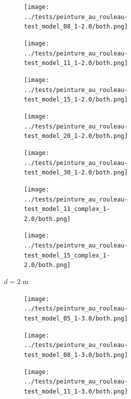 \documentclass[english,RandD]{rapportPFE}  %
\begin{document}
\begin{figure}[H]
\begin{subfigure}[t]{\linewidth}
\begin{subfigure}[t]{0.11\linewidth}
				\end{subfigure}
				\hfill
				\begin{subfigure}[t]{0.11\linewidth}
					\texttt{[image: ../tests/peinture\_au\_rouleau-test\_model\_08\_1-2.0/both.png]}
				\end{subfigure}
				\hfill
				\begin{subfigure}[t]{0.11\linewidth}
					\texttt{[image: ../tests/peinture\_au\_rouleau-test\_model\_11\_1-2.0/both.png]}
				\end{subfigure}
				\hfill
				\begin{subfigure}[t]{0.11\linewidth}
					\texttt{[image: ../tests/peinture\_au\_rouleau-test\_model\_15\_1-2.0/both.png]}
				\end{subfigure}
				\hfill
				\begin{subfigure}[t]{0.1\linewidth}
					\texttt{[image: ../tests/peinture\_au\_rouleau-test\_model\_20\_1-2.0/both.png]}
				\end{subfigure}
				\hfill
				\begin{subfigure}[t]{0.11\linewidth}
					\texttt{[image: ../tests/peinture\_au\_rouleau-test\_model\_30\_1-2.0/both.png]}
				\end{subfigure}
				\hfill
				\begin{subfigure}[t]{0.11\linewidth}
					\texttt{[image: ../tests/peinture\_au\_rouleau-test\_model\_11\_complex\_1-2.0/both.png]}
				\end{subfigure}
				\hfill
				\begin{subfigure}[t]{0.11\linewidth}
					\texttt{[image: ../tests/peinture\_au\_rouleau-test\_model\_15\_complex\_1-2.0/both.png]}
				\end{subfigure}
				\caption{$d = 2$ m}
			\end{subfigure}
			\hfill
			\begin{subfigure}[t]{\linewidth}
				\centering
				\begin{subfigure}[t]{0.11\linewidth}
					\texttt{[image: ../tests/peinture\_au\_rouleau-test\_model\_05\_1-3.0/both.png]}
				\end{subfigure}
				\hfill
				\begin{subfigure}[t]{0.11\linewidth}
					\texttt{[image: ../tests/peinture\_au\_rouleau-test\_model\_08\_1-3.0/both.png]}
				\end{subfigure}
				\hfill
				\begin{subfigure}[t]{0.11\linewidth}
					\texttt{[image: ../tests/peinture\_au\_rouleau-test\_model\_11\_1-3.0/both.png]}
				\end{subfigure}

\end{subfigure}
\end{figure}
\end{document}
